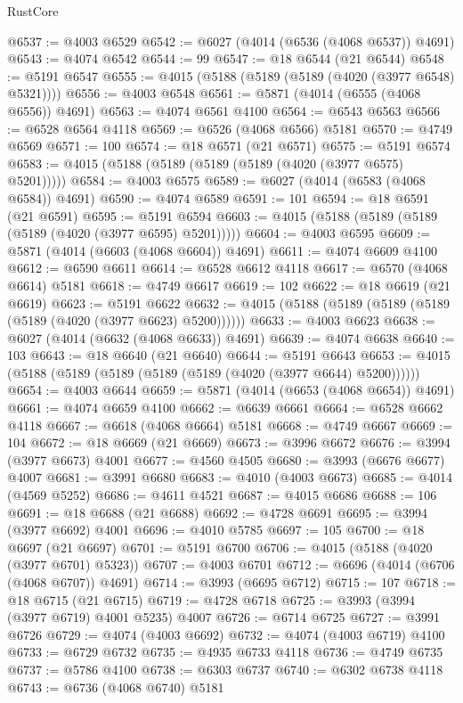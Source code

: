 \begin{lexlean}{RustCore}
\begin{coremodule}
@6537 := @4003 @6529
@6542 := @6027 (@4014 (@6536 (@4068 @6537)) @4691)
@6543 := @4074 @6542
@6544 := 99
@6547 := @18 @6544 (@21 @6544)
@6548 := @5191 @6547
@6555 := @4015 (@5188 (@5189 (@5189 (@4020 (@3977 @6548) @5321))))
@6556 := @4003 @6548
@6561 := @5871 (@4014 (@6555 (@4068 @6556)) @4691)
@6563 := @4074 @6561 @4100
@6564 := @6543 @6563
@6566 := @6528 @6564 @4118
@6569 := @6526 (@4068 @6566) @5181
@6570 := @4749 @6569
@6571 := 100
@6574 := @18 @6571 (@21 @6571)
@6575 := @5191 @6574
@6583 := @4015 (@5188 (@5189 (@5189 (@5189 (@4020 (@3977 @6575) @5201)))))
@6584 := @4003 @6575
@6589 := @6027 (@4014 (@6583 (@4068 @6584)) @4691)
@6590 := @4074 @6589
@6591 := 101
@6594 := @18 @6591 (@21 @6591)
@6595 := @5191 @6594
@6603 := @4015 (@5188 (@5189 (@5189 (@5189 (@4020 (@3977 @6595) @5201)))))
@6604 := @4003 @6595
@6609 := @5871 (@4014 (@6603 (@4068 @6604)) @4691)
@6611 := @4074 @6609 @4100
@6612 := @6590 @6611
@6614 := @6528 @6612 @4118
@6617 := @6570 (@4068 @6614) @5181
@6618 := @4749 @6617
@6619 := 102
@6622 := @18 @6619 (@21 @6619)
@6623 := @5191 @6622
@6632 := @4015 (@5188 (@5189 (@5189 (@5189 (@5189 (@4020 (@3977 @6623) @5200))))))
@6633 := @4003 @6623
@6638 := @6027 (@4014 (@6632 (@4068 @6633)) @4691)
@6639 := @4074 @6638
@6640 := 103
@6643 := @18 @6640 (@21 @6640)
@6644 := @5191 @6643
@6653 := @4015 (@5188 (@5189 (@5189 (@5189 (@5189 (@4020 (@3977 @6644) @5200))))))
@6654 := @4003 @6644
@6659 := @5871 (@4014 (@6653 (@4068 @6654)) @4691)
@6661 := @4074 @6659 @4100
@6662 := @6639 @6661
@6664 := @6528 @6662 @4118
@6667 := @6618 (@4068 @6664) @5181
@6668 := @4749 @6667
@6669 := 104
@6672 := @18 @6669 (@21 @6669)
@6673 := @3996 @6672
@6676 := @3994 (@3977 @6673) @4001
@6677 := @4560 @4505
@6680 := @3993 (@6676 @6677) @4007
@6681 := @3991 @6680
@6683 := @4010 (@4003 @6673)
@6685 := @4014 (@4569 @5252)
@6686 := @4611 @4521
@6687 := @4015 @6686
@6688 := 106
@6691 := @18 @6688 (@21 @6688)
@6692 := @4728 @6691
@6695 := @3994 (@3977 @6692) @4001
@6696 := @4010 @5785
@6697 := 105
@6700 := @18 @6697 (@21 @6697)
@6701 := @5191 @6700
@6706 := @4015 (@5188 (@4020 (@3977 @6701) @5323))
@6707 := @4003 @6701
@6712 := @6696 (@4014 (@6706 (@4068 @6707)) @4691)
@6714 := @3993 (@6695 @6712)
@6715 := 107
@6718 := @18 @6715 (@21 @6715)
@6719 := @4728 @6718
@6725 := @3993 (@3994 (@3977 @6719) @4001 @5235) @4007
@6726 := @6714 @6725
@6727 := @3991 @6726
@6729 := @4074 (@4003 @6692)
@6732 := @4074 (@4003 @6719) @4100
@6733 := @6729 @6732
@6735 := @4935 @6733 @4118
@6736 := @4749 @6735
@6737 := @5786 @4100
@6738 := @6303 @6737
@6740 := @6302 @6738 @4118
@6743 := @6736 (@4068 @6740) @5181

\end{coremodule}
\end{lexlean}
